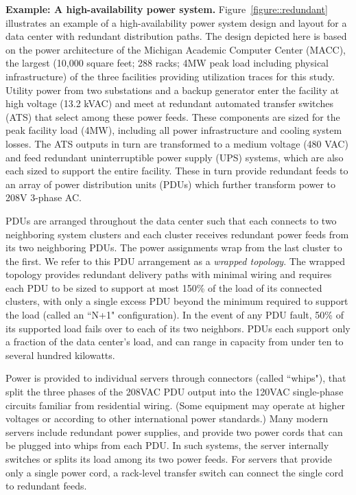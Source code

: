 \textbf{Example: A high-availability power system.} Figure~\ref{figure::redundant} illustrates an example of a high-availability power system design and layout for a data center with redundant distribution paths.  The design depicted here is based on the power architecture of the Michigan Academic Computer Center (MACC), the largest (10,000 square feet; 288 racks; 4MW peak load including physical infrastructure) of the three facilities providing utilization traces for this study. Utility power from two substations and a backup generator enter the facility at high voltage (13.2 kVAC) and meet at redundant automated transfer switches (ATS) that select among these power feeds.  These components are sized for the peak facility load (4MW), including all power infrastructure and cooling system losses.  The ATS outputs in turn are transformed to a medium voltage (480 VAC) and feed redundant uninterruptible power supply (UPS) systems, which are also each sized to support the entire facility.  These in turn provide redundant feeds to an array of power distribution units (PDUs) which further transform power to 208V 3-phase AC.  

PDUs are arranged throughout the data center such that each connects to two neighboring system clusters and each cluster receives redundant power feeds from its two neighboring PDUs.  The power assignments wrap from the last cluster to the first.  We refer to this PDU arrangement as a \emph{wrapped topology}. The wrapped topology provides redundant delivery paths with minimal wiring and requires each PDU to be sized to support  at most 150\% of the load of its connected clusters, with only a single excess PDU beyond the minimum required to support the load (called an ``N+1" configuration).  In the event of any PDU fault, 50\% of its supported load fails over to each of its two neighbors.  PDUs each support only a fraction of the data center's load, and can range in capacity from under ten to several hundred kilowatts.

Power is provided to individual servers through connectors (called ``whips"), that split the three phases of the 208VAC PDU output into the 120VAC single-phase circuits familiar from residential wiring.  (Some equipment may operate at higher voltages or according to other international power standards.) Many modern servers include redundant power supplies, and provide two power cords that can be plugged into whips from each PDU.  In such systems, the server internally switches or splits its load among its two power feeds.  For servers that provide only a single power cord, a rack-level transfer switch can connect the single cord to redundant feeds.

